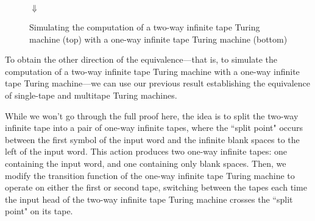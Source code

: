 \begin{figure}
\centering
{}

\smallskip
$\Downarrow$
\medskip

\caption{Simulating the computation of a two-way infinite tape Turing machine (top) with a one-way infinite tape Turing machine (bottom)}
\label{fig:TMtwowaytooneway}
\end{figure}

To obtain the other direction of the equivalence---that is, to simulate the computation of a two-way infinite tape Turing machine with a one-way infinite tape Turing machine---we can use our previous result establishing the equivalence of single-tape and multitape Turing machines.

While we won't go through the full proof here, the idea is to split the two-way infinite tape into a pair of one-way infinite tapes, where the ``split point" occurs between the first symbol of the input word and the infinite blank spaces to the left of the input word. This action produces two one-way infinite tapes: one containing the input word, and one containing only blank spaces. Then, we modify the transition function of the one-way infinite tape Turing machine to operate on either the first or second tape, switching between the tapes each time the input head of the two-way infinite tape Turing machine crosses the ``split point" on its tape.

